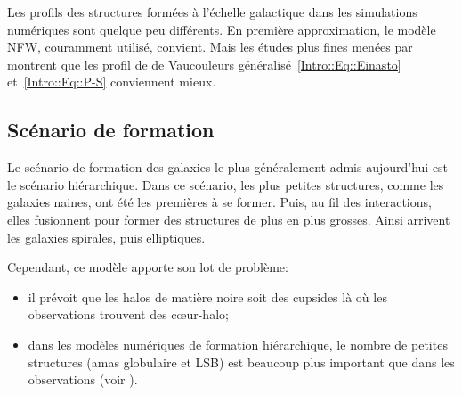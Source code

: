 			Les profils des structures formées à l'échelle
			galactique dans les simulations numériques sont quelque
			peu différents. En première approximation, le modèle
			NFW, couramment utilisé, convient. Mais les études plus
			fines menées par \cite{2006AJ....132.2685M,2006AJ....132.2701G,2006AJ....132.2711G} montrent que
			les profil de de Vaucouleurs généralisé~\ref{Intro::Eq::Einasto} et~\ref{Intro::Eq::P-S} conviennent mieux.


		\subsection{Scénario de formation}
			Le scénario de formation des galaxies le plus généralement admis aujourd'hui est le scénario
			hiérarchique. Dans ce scénario, les plus petites structures, comme les galaxies naines, ont
			été les premières à se former. Puis, au fil des interactions, elles fusionnent pour former
			des structures de plus en plus grosses. Ainsi arrivent les galaxies spirales, puis
			elliptiques.


			Cependant, ce modèle apporte son lot de problème:
			\begin{itemize}
				\item il prévoit que les halos de matière noire soit des cupsides là où les observations
					trouvent des cœur-halo;
				\item dans les modèles numériques de formation hiérarchique, le nombre de petites
					structures (amas globulaire et LSB) est beaucoup plus important que dans les
					observations (voir \citet{2006CombesBook}).
			\end{itemize}
